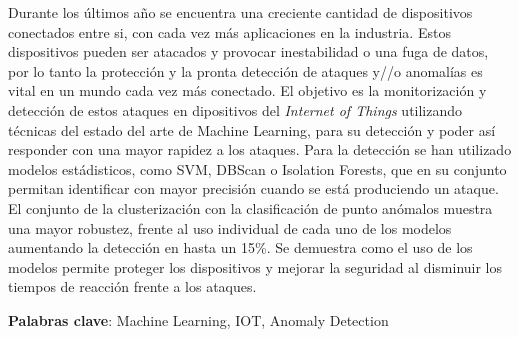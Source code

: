 Durante los últimos año se encuentra una creciente cantidad de dispositivos conectados entre si, con cada vez más aplicaciones en la industria. Estos dispositivos pueden ser atacados y provocar inestabilidad o una fuga de datos, por lo tanto la protección y la pronta detección de ataques y//o anomalías es vital en un mundo cada vez más conectado. El objetivo es la monitorización y detección de estos ataques en dipositivos del \textit{Internet of Things} utilizando técnicas del estado del arte de Machine Learning, para su detección y poder así responder con una mayor rapidez a los ataques. Para la detección se han utilizado modelos estádisticos, como SVM, DBScan o Isolation Forests, que en su conjunto permitan identificar con mayor precisión cuando se está produciendo un ataque. El conjunto de la clusterización con la clasificación de punto anómalos muestra una mayor robustez, frente al uso individual de cada uno de los modelos aumentando la detección en hasta un 15\%. Se demuestra como el uso de los modelos permite proteger los dispositivos y mejorar la seguridad al disminuir los tiempos de reacción frente a los ataques.

\vspace{1.5cm}

\textbf{Palabras clave}: Machine Learning, IOT, Anomaly Detection
